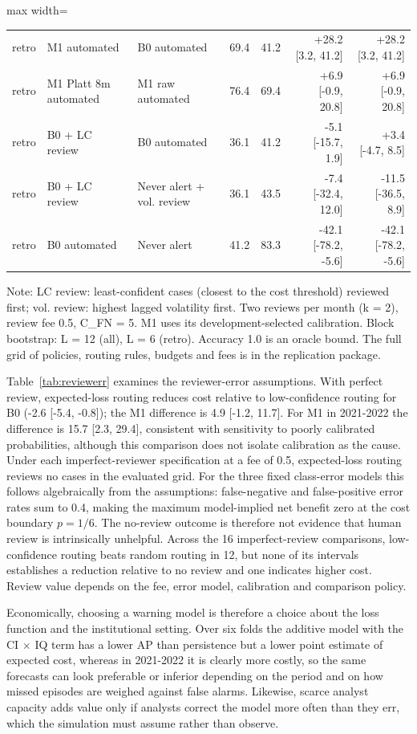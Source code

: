 \documentclass[preprint,12pt,authoryear]{elsarticle}
\begin{document}
\begin{table}[!htbp]
\begin{adjustbox}{max width=\textwidth}
\begin{tabular}{lllrrrr}
retro & M1 automated & B0 automated & 69.4 & 41.2 & +28.2 [3.2, 41.2] & +28.2 [3.2, 41.2] \\
retro & M1 Platt 8m automated & M1 raw automated & 76.4 & 69.4 & +6.9 [-0.9, 20.8] & +6.9 [-0.9, 20.8] \\
retro & B0 + LC review & B0 automated & 36.1 & 41.2 & -5.1 [-15.7, 1.9] & +3.4 [-4.7, 8.5] \\
retro & B0 + LC review & Never alert + vol. review & 36.1 & 43.5 & -7.4 [-32.4, 12.0] & -11.5 [-36.5, 8.9] \\
retro & B0 automated & Never alert & 41.2 & 83.3 & -42.1 [-78.2, -5.6] & -42.1 [-78.2, -5.6] \\
\bottomrule
\end{tabular}
\end{adjustbox}
\par\vspace{2pt}\parbox{0.95\linewidth}{\scriptsize Note: LC review: least-confident cases (closest to the cost threshold) reviewed first; vol. review: highest lagged volatility first. Two reviews per month (k = 2), review fee 0.5, C\_FN = 5. M1 uses its development-selected calibration. Block bootstrap: L = 12 (all), L = 6 (retro). Accuracy 1.0 is an oracle bound. The full grid of policies, routing rules, budgets and fees is in the replication package.}
\end{table}
Table~\ref{tab:reviewerr} examines the reviewer-error assumptions. With perfect review, expected-loss routing reduces cost relative to low-confidence routing for B0 (-2.6 [-5.4, -0.8]); the M1 difference is 4.9 [-1.2, 11.7]. For M1 in 2021-2022 the difference is 15.7 [2.3, 29.4], consistent with sensitivity to poorly calibrated probabilities, although this comparison does not isolate calibration as the cause. Under each imperfect-reviewer specification at a fee of 0.5, expected-loss routing reviews no cases in the evaluated grid. For the three fixed class-error models this follows algebraically from the assumptions: false-negative and false-positive error rates sum to 0.4, making the maximum model-implied net benefit zero at the cost boundary $p = 1/6$. The no-review outcome is therefore not evidence that human review is intrinsically unhelpful. Across the 16 imperfect-review comparisons, low-confidence routing beats random routing in 12, but none of its intervals establishes a reduction relative to no review and one indicates higher cost. Review value depends on the fee, error model, calibration and comparison policy.

Economically, choosing a warning model is therefore a choice about the loss function and the institutional setting. Over six folds the additive model with the CI $\times$ IQ term has a lower AP than persistence but a lower point estimate of expected cost, whereas in 2021-2022 it is clearly more costly, so the same forecasts can look preferable or inferior depending on the period and on how missed episodes are weighed against false alarms. Likewise, scarce analyst capacity adds value only if analysts correct the model more often than they err, which the simulation must assume rather than observe.
\end{document}
